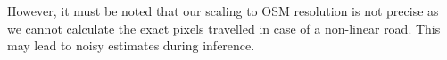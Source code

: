 However, it must be noted that our scaling to OSM resolution is not precise as we cannot calculate the exact pixels travelled in case of a non-linear road. This may lead to noisy estimates during inference. 













































































